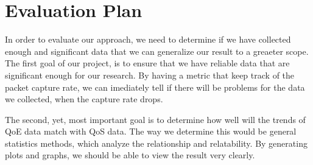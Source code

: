 \section{Evaluation Plan}\label{evaluation}
    In order to evaluate our approach, we need to determine if we have collected enough and significant data that we can generalize our result to a greaeter scope. The first goal of our project, is to ensure that we have reliable data that are significant enough for our research. By having a metric that keep track of the packet capture rate, we can imediately tell if there will be problems for the data we collected, when the capture rate drops. 
    
    The second, yet, most important goal is to determine how well will the trends of QoE data match with QoS data. The way we determine this would be general statistics methods, which analyze the relationship and relatability. By generating plots and graphs, we should be able to view the result very clearly.